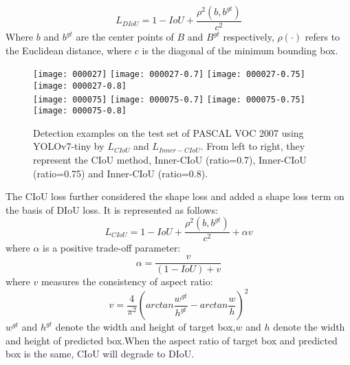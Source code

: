 \documentclass[lettersize,journal]{IEEEtran}
\begin{document}
	\begin{equation}
		L_{DIoU}=1-IoU+\displaystyle\frac{\rho^{2}(b,b^{gt})}{c^{2}}
	\end{equation}
	Where $b$ and $b^{gt}$  are the center points of ${B}$ and $B^{gt}$ respectively, $\rho\left(\cdot\right) $  refers to the Euclidean distance, where $c$ is the diagonal of the minimum bounding box.
	\begin{figure*} [h]
		\centering
			\texttt{[image: 000027]}
		\hspace{0.1cm}
		\vspace{0.4cm}
			\texttt{[image: 000027-0.7]}
		\hspace{0.1cm}
			\texttt{[image: 000027-0.75]}
		\hspace{0.1cm}
			\texttt{[image: 000027-0.8]}
		\\
		\centering
			\texttt{[image: 000075]} 
		\hspace{0.05cm}
			\texttt{[image: 000075-0.7]}
		\hspace{0.1cm}
			\texttt{[image: 000075-0.75]}
		\hspace{0.1cm}
			\texttt{[image: 000075-0.8]}
		\caption{Detection examples on the test set of PASCAL VOC 2007 using YOLOv7-tiny by $L_{CIoU}$ and $L_{Inner-CIoU}$. From left to right, they represent the CIoU method, Inner-CIoU (ratio=0.7), Inner-CIoU (ratio=0.75) and Inner-CIoU (ratio=0.8). }
		\label{fig_2} 
	\end{figure*}
	\par The CIoU loss\cite{ref3} further considered the shape loss and added a shape loss term on the basis of DIoU loss. It is represented as follows:
	\begin{equation}
		L_{CIoU}=1-IoU+\displaystyle\frac{\rho^{2}(b,b^{gt})}{c^{2}}+\alpha v
	\end{equation}
	where $\alpha$ is a positive trade-off parameter:
	\begin{equation}
		\alpha=\displaystyle\frac{v}{(1-IoU)+v}
	\end{equation}
	where $v$ measures the consistency of aspect ratio:
	\begin{equation}
		v=\displaystyle\frac{4}{\pi^{2}}(arctan\displaystyle\frac{w^{gt}}{h^{gt}}-arctan\displaystyle\frac{w}{h})^{2}
	\end{equation}
	$w^{gt}$ and $h^{gt}$ denote the width and height of target box,$w$ and $h$ denote the width and height of predicted box.When the aspect ratio of target box and predicted box is the same, CIoU will degrade to DIoU.
\end{document}
